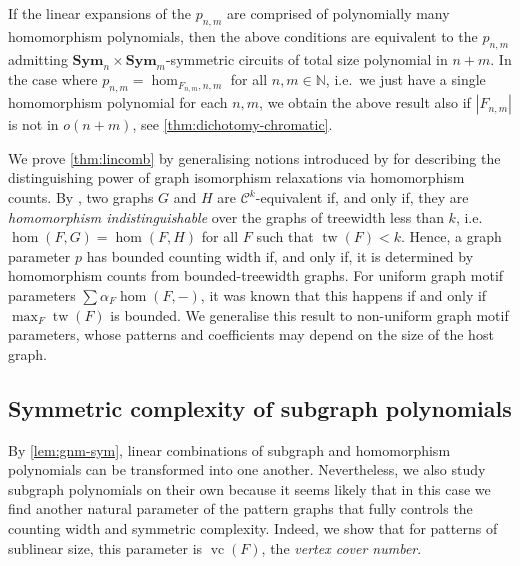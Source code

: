 \documentclass[11pt, DIV=15]{scrarticle}
\theoremstyle{definition}
\theoremstyle{plain}
\theoremstyle{remark}
\DeclareMathOperator{\tw}{tw}
\DeclareMathOperator{\vc}{vc}
\newcommand{\Sym}{\mathbf{Sym}}
\newcommand{\bbN}{\mathbb{N}}
\begin{document}
If the linear expansions of the $p_{n,m}$ are comprised of polynomially many homomorphism polynomials,
then the above conditions are equivalent to   the $p_{n,m}$ admitting $\Sym_n\times \Sym_m$-symmetric circuits of total size polynomial in $n+m$.
In the case where $p_{n,m} = \hom_{F_{n,m}, n,m}$ for all $n,m \in \bbN$, i.e.\ we just have a single homomorphism polynomial for each $n,m$, we obtain the above result also if $|F_{n,m}|$ is not in $o(n+m)$, see \cref{thm:dichotomy-chromatic}.


We prove \cref{thm:lincomb} by generalising notions introduced by \textcite{roberson_oddomorphisms_2022} for describing the distinguishing power of graph isomorphism relaxations via homomorphism counts. 
By \cite{dvorak_recognizing_2010,dell-grohe-rattan},
two graphs $G$ and $H$ are $\mathcal{C}^k$-equivalent if, and only if, they are \emph{homomorphism indistinguishable} over the graphs of treewidth less than $k$, i.e.\ $\hom(F,G) = \hom(F, H)$ for all $F$ such that $\tw(F) < k$.
Hence, a graph parameter $p$ has bounded counting width if, and only if, it is determined by homomorphism counts from bounded-treewidth graphs.
For uniform graph motif parameters $\sum \alpha_F \hom(F, -)$, it was known \cite{seppelt_logical_2024,neuen_homomorphism-distinguishing_2024,lanzinger2024on} that this happens if and only if $\max_F \tw(F)$ is bounded.
We generalise this result to non-uniform graph motif parameters, whose patterns and coefficients may depend on the size of the host graph.

	
\subsection{Symmetric complexity of subgraph polynomials}	
By \cref{lem:gnm-sym}, linear combinations of subgraph and homomorphism polynomials can be transformed into one another. Nevertheless, we also study subgraph polynomials on their own because it seems likely that in this case we find another natural parameter of the pattern graphs that fully controls the counting width and symmetric complexity. Indeed, we show that for patterns of sublinear size, this parameter is $\vc(F)$, the \emph{vertex cover number}. 
\end{document}
